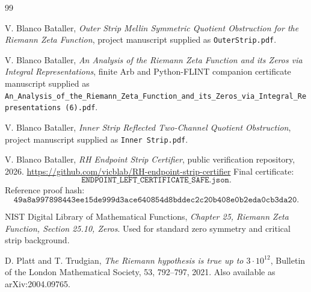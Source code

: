 \documentclass[11pt]{article}
\begin{document}
\begin{thebibliography}{99}

V. Blanco Bataller,
\emph{Outer Strip Mellin Symmetric Quotient Obstruction for the Riemann Zeta Function},
project manuscript supplied as \texttt{OuterStrip.pdf}.

V. Blanco Bataller,
\emph{An Analysis of the Riemann Zeta Function and its Zeros via Integral Representations},
finite Arb and Python-FLINT companion certificate manuscript supplied as
\texttt{An\_Analysis\_of\_the\_Riemann\_Zeta\_Function\_and\_its\_Zeros\_via\_Integral\_Representations (6).pdf}.

V. Blanco Bataller,
\emph{Inner Strip Reflected Two-Channel Quotient Obstruction},
project manuscript supplied as \texttt{Inner Strip.pdf}.

V. Blanco Bataller,
\emph{RH Endpoint Strip Certifier},
public verification repository, 2026.
\url{https://github.com/vicblab/RH-endpoint-strip-certifier}
Final certificate:
\[
\texttt{ENDPOINT\_LEFT\_CERTIFICATE\_SAFE.json}.
\]
Reference proof hash:
\[
\texttt{49a8a997898443ee15de999d3ace640854d8bddec2c20b408e0b2eda0cb3da20}.
\]

NIST Digital Library of Mathematical Functions,
\emph{Chapter 25, Riemann Zeta Function, Section 25.10, Zeros}.
Used for standard zero symmetry and critical strip background.

D. Platt and T. Trudgian,
\emph{The Riemann hypothesis is true up to \(3\cdot10^{12}\)},
Bulletin of the London Mathematical Society, 53, 792--797, 2021.
Also available as arXiv:2004.09765.

\end{thebibliography}
\end{document}
